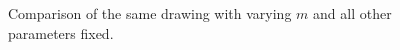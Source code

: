 \begin{itemize}
\begin{figure}[ht]
\centering
{}
\\
\\
\caption{Comparison of the same drawing with varying $m$ and all other parameters fixed.}
\label{fig:param_m}
\end{figure}

\end{itemize}
